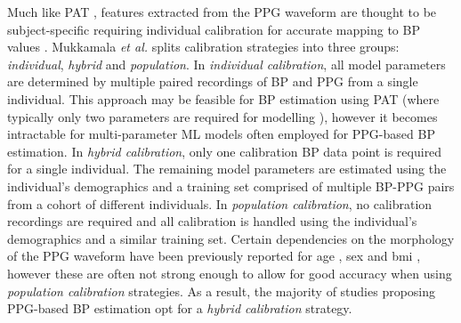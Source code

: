 \documentclass[fleqn,10pt]{wlscirep}
\begin{document}
Much like PAT \cite{Finnegan2021}, features extracted from the PPG waveform are thought to be subject-specific requiring individual calibration for accurate mapping to BP values \cite{Mukkamala2022}. Mukkamala \textit{et al.} \cite{Mukkamala2022} splits calibration strategies into three groups: \textit{individual}, \textit{hybrid} and \textit{population}. In \textit{individual calibration}, all model parameters are determined by multiple paired recordings of BP and PPG from a single individual. This approach may be feasible for BP estimation using PAT (where typically only two parameters are required for modelling \cite{Finnegan2021}), however it becomes intractable for multi-parameter ML models often employed for PPG-based BP estimation. In \textit{hybrid calibration}, only one calibration BP data point is required for a single individual. The remaining model parameters are estimated using the individual's demographics and a training set comprised of multiple BP-PPG pairs from a cohort of different individuals. In \textit{population calibration}, no calibration recordings are required and all calibration is handled using the individual's demographics and a similar training set. Certain dependencies on the morphology of the PPG waveform have been previously reported for age \cite{Millasseau2002}, sex \cite{Dehghanojamahalleh2019} and \ac{bmi} \cite{Boonya-Ananta2021}, however these are often not strong enough to allow for good accuracy when using \textit{population calibration} strategies. As a result, the majority of studies proposing PPG-based BP estimation opt for a \textit{hybrid calibration} strategy.  
\end{document}
